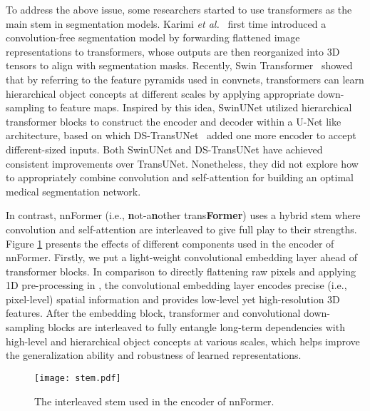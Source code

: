 \documentclass[journal,twoside,web]{ieeecolor}
\newcommand{\etal}{\textit{et al.}}
\begin{document}
To address the above issue, some researchers \cite{karimi2021convolution,cao2021swin,lin2021ds} started to use transformers as the main stem in segmentation models. Karimi \etal~\cite{karimi2021convolution} first time introduced a convolution-free segmentation model by forwarding flattened image representations to transformers, whose outputs are then reorganized into 3D tensors to align with segmentation masks. Recently, Swin Transformer~\cite{liu2021swin} showed that by referring to the feature pyramids used in convnets, transformers can learn hierarchical object concepts at different scales by applying appropriate down-sampling to feature maps. Inspired by this idea, SwinUNet \cite{cao2021swin} utilized hierarchical transformer blocks to construct the encoder and decoder within a U-Net like architecture, based on which DS-TransUNet~\cite{lin2021ds} added one more encoder to accept different-sized inputs. Both SwinUNet and DS-TransUNet have achieved consistent improvements over TransUNet. Nonetheless, they did not explore how to appropriately combine convolution and self-attention for building an optimal medical segmentation network. 

In contrast, nnFormer (i.e., \textbf{n}ot-a\textbf{n}other trans\textbf{Former}) uses a hybrid stem where convolution and self-attention are interleaved to give full play to their strengths. Figure \ref{stem} presents the effects of different components used in the encoder of nnFormer. Firstly, we put a light-weight convolutional embedding layer ahead of transformer blocks. In comparison to directly flattening raw pixels and applying 1D pre-processing in \cite{karimi2021convolution}, the convolutional embedding layer encodes precise (i.e., pixel-level) spatial information and provides low-level yet high-resolution 3D features. After the embedding block, transformer and convolutional down-sampling blocks are interleaved to fully entangle long-term dependencies with high-level and hierarchical object concepts at various scales, which helps improve the generalization ability and robustness of learned representations. 
\begin{figure}[t]
    \centering
    \texttt{[image: stem.pdf]}
    \caption{The interleaved stem used in the encoder of nnFormer.}
    \label{stem}
\end{figure}
\end{document}
